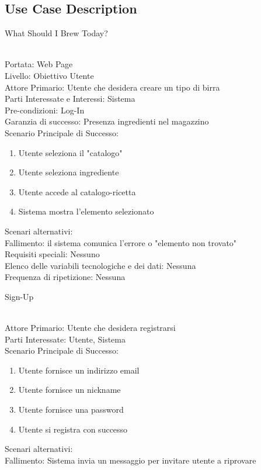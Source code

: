 \documentclass[12pt]{article}
\begin{document}
\subsection{Use Case Description}
\begin{itshape}
What Should I Brew Today?
\end{itshape}\\
Portata: Web Page\\
Livello: Obiettivo Utente\\
Attore Primario: Utente che desidera creare un tipo di birra\\
Parti Interessate e Interessi: Sistema\\
Pre-condizioni: Log-In\\
Garanzia di successo: Presenza ingredienti nel magazzino\\
Scenario Principale di Successo:
\begin{enumerate}
\item Utente seleziona il "catalogo"
\item Utente seleziona ingrediente
\item Utente accede al catalogo-ricetta
\item Sistema mostra l'elemento selezionato
\end{enumerate}
Scenari alternativi:\\
Fallimento: il sistema comunica l'errore o "elemento non trovato"\\
Requisiti speciali: Nessuno\\
Elenco delle variabili tecnologiche e dei dati: Nessuna\\
Frequenza di ripetizione: Nessuna
\bigskip
\\
\begin{itshape}
Sign-Up
\end{itshape}\\
Attore Primario: Utente che desidera registrarsi\\
Parti Interessate: Utente, Sistema\\
Scenario Principale di Successo:
\begin{enumerate}
\item Utente fornisce un indirizzo email
\item Utente fornisce un nickname
\item Utente fornisce una password
\item Utente si registra con successo
\end{enumerate}
Scenari alternativi:\\
Fallimento: Sistema invia un messaggio per invitare utente a riprovare
\end{document}

